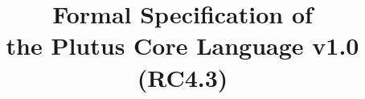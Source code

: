 \documentclass[conference]{IEEEtran}
\begin{document}
%
\title{Formal Specification of\\the Plutus Core Language v1.0 (RC4.3)}











% 








\maketitle
\end{document}
